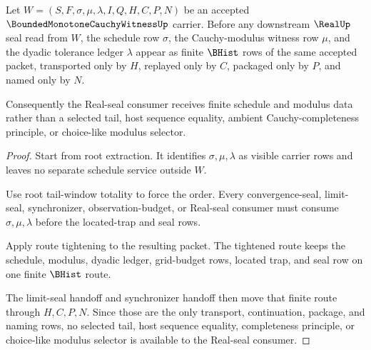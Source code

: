 \begin{theorem}
\label{thm:bounded-monotone-cauchy-witness-schedule-factorization}
Let $W=(S,F,\sigma,\mu,\lambda,I,Q,H,C,P,N)$ be an accepted $\BoundedMonotoneCauchyWitnessUp$ carrier. Before any downstream $\RealUp$ seal read from $W$, the schedule row $\sigma$, the Cauchy-modulus witness row $\mu$, and the dyadic tolerance ledger $\lambda$ appear as finite $\BHist$ rows of the same accepted packet, transported only by $H$, replayed only by $C$, packaged only by $P$, and named only by $N$.

Consequently the Real-seal consumer receives finite schedule and modulus data rather than a selected tail, host sequence equality, ambient Cauchy-completeness principle, or choice-like modulus selector.
\end{theorem}
\begin{proof}
Start from root extraction. It identifies $\sigma,\mu,\lambda$ as visible carrier rows and leaves no separate schedule service outside $W$.

Use root tail-window totality to force the order. Every convergence-seal, limit-seal, synchronizer, observation-budget, or Real-seal consumer must consume $\sigma,\mu,\lambda$ before the located-trap and seal rows.

Apply route tightening to the resulting packet. The tightened route keeps the schedule, modulus, dyadic ledger, grid-budget rows, located trap, and seal row on one finite $\BHist$ route.

The limit-seal handoff and synchronizer handoff then move that finite route through $H,C,P,N$. Since those are the only transport, continuation, package, and naming rows, no selected tail, host sequence equality, completeness principle, or choice-like modulus selector is available to the Real-seal consumer.
\end{proof}

